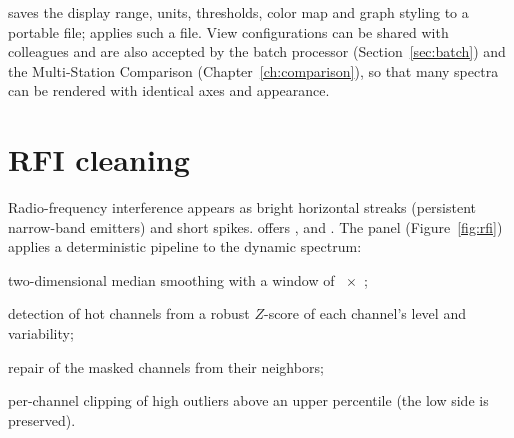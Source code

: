  saves the display range, units, thresholds, color map
and graph styling to a portable  file;  applies such a file. View configurations can be shared with colleagues and are
also accepted by the batch processor (Section~\ref{sec:batch}) and the Multi-Station
Comparison (Chapter~\ref{ch:comparison}), so that many spectra can be rendered with
identical axes and appearance.

\section{RFI cleaning}
\label{sec:rfi}

Radio-frequency interference appears as bright horizontal streaks (persistent
narrow-band emitters) and short spikes.  offers
,  and . The  panel
(Figure~\ref{fig:rfi}) applies a deterministic pipeline to the dynamic spectrum:
\begin{steps}
  \item two-dimensional median smoothing with a window of
    ~\(\times\)~;
  \item detection of hot channels from a robust \(Z\)-score of each channel's level and
    variability;
  \item repair of the masked channels from their neighbors;
  \item per-channel clipping of high outliers above an upper percentile (the low side is
    preserved).
\end{steps}



